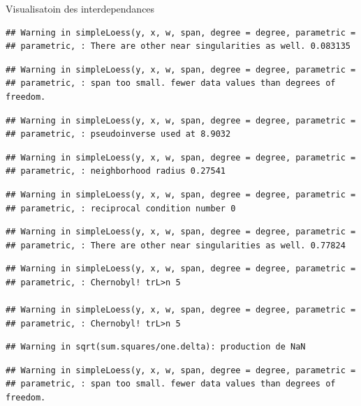 \documentclass[11pt,ignorenonframetext,]{beamer}
\begin{document}
\begin{frame}[fragile]{Visualisatoin des interdependances}
\begin{verbatim}
## Warning in simpleLoess(y, x, w, span, degree = degree, parametric =
## parametric, : There are other near singularities as well. 0.083135
\end{verbatim}

\begin{verbatim}
## Warning in simpleLoess(y, x, w, span, degree = degree, parametric =
## parametric, : span too small. fewer data values than degrees of freedom.
\end{verbatim}

\begin{verbatim}
## Warning in simpleLoess(y, x, w, span, degree = degree, parametric =
## parametric, : pseudoinverse used at 8.9032
\end{verbatim}

\begin{verbatim}
## Warning in simpleLoess(y, x, w, span, degree = degree, parametric =
## parametric, : neighborhood radius 0.27541
\end{verbatim}

\begin{verbatim}
## Warning in simpleLoess(y, x, w, span, degree = degree, parametric =
## parametric, : reciprocal condition number 0
\end{verbatim}

\begin{verbatim}
## Warning in simpleLoess(y, x, w, span, degree = degree, parametric =
## parametric, : There are other near singularities as well. 0.77824
\end{verbatim}

\begin{verbatim}
## Warning in simpleLoess(y, x, w, span, degree = degree, parametric =
## parametric, : Chernobyl! trL>n 5

## Warning in simpleLoess(y, x, w, span, degree = degree, parametric =
## parametric, : Chernobyl! trL>n 5
\end{verbatim}

\begin{verbatim}
## Warning in sqrt(sum.squares/one.delta): production de NaN
\end{verbatim}

\begin{verbatim}
## Warning in simpleLoess(y, x, w, span, degree = degree, parametric =
## parametric, : span too small. fewer data values than degrees of freedom.
\end{verbatim}


\end{frame}
\end{document}
